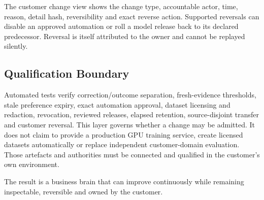 The customer change view shows the change type, accountable actor, time, reason, detail hash,
reversibility and exact reverse action.  Supported reversals can disable an approved automation or
roll a model release back to its declared predecessor.  Reversal is itself attributed to the owner
and cannot be replayed silently.

\subsection{Qualification Boundary}

Automated tests verify correction/outcome separation, fresh-evidence thresholds, stale preference
expiry, exact automation approval, dataset licensing and redaction, revocation, reviewed releases,
elapsed retention, source-disjoint transfer and customer reversal.  This layer governs whether a
change may be admitted.  It does not claim to provide a production GPU training service, create
licensed datasets automatically or replace independent customer-domain evaluation.  Those artefacts
and authorities must be connected and qualified in the customer's own environment.

The result is a business brain that can improve continuously while remaining inspectable, reversible
and owned by the customer.
